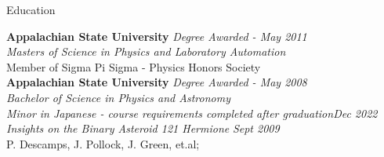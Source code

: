 \documentclass{cv} %
\begin{document}

\begin{rSection}{Education}
	
	{\bf Appalachian State University} \hfill {\em Degree Awarded - May 2011} \\ 
	{\em Masters of Science in Physics and Laboratory Automation} \\
	Member of Sigma Pi Sigma - Physics Honors Society \\
	
	{\bf Appalachian State University} \hfill {\em Degree Awarded - May 2008} \\ 
	{\em Bachelor of Science in Physics and Astronomy} \\
	{\em Minor in Japanese - course requirements completed after graduation}\hfill{\em Dec 2022}\\
	{\em Insights on the Binary Asteroid 121 Hermione} \hfill {\em Sept 2009} \\ {P. Descamps, J. Pollock, J. Green, et.al;}
	
	
\end{rSection}
\end{document}
